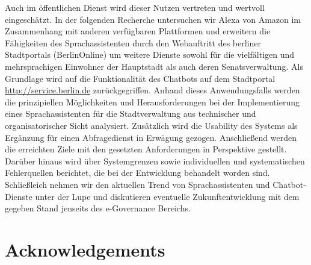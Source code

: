Auch im öffentlichen Dienst wird dieser Nutzen vertreten und wertvoll eingeschätzt. In der folgenden Recherche untersuchen wir Alexa von Amazon im Zusammenhang mit anderen verfügbaren Plattformen und erweitern die Fähigkeiten des Sprachassistenten durch den Webauftritt des berliner Stadtportals (BerlinOnline) um weitere Dienste sowohl für die vielfältigen und mehrsprachigen Einwohner der Hauptstadt als auch deren Senatsverwaltung. Als Grundlage wird auf die Funktionalität des Chatbots auf dem Stadtportal \href{ https://service.berlin.de/virtueller-assistent/virtueller-assistent-606279.php}{http://service.berlin.de} zurückgegriffen. Anhand dieses Anwendungsfalls werden die prinzipiellen Möglichkeiten und Herausforderungen bei der Implementierung eines Sprachassistenten für die Stadtverwaltung aus technischer und organisatorischer Sicht analysiert. Zusätzlich wird die Usability des Systems als Ergänzung für einen Abfragedienst in Erwägung gezogen. Anschließend werden die erreichten Ziele mit den gesetzten Anforderungen in Perspektive gestellt. Darüber hinaus wird über Systemgrenzen sowie individuellen und systematischen Fehlerquellen berichtet, die bei der Entwicklung behandelt worden sind.\\


Schließleich nehmen wir den aktuellen Trend von Sprachassistenten und Chatbot-Dienste unter der Lupe und diskutieren eventuelle Zukunftentwicklung mit dem gegeben Stand jenseits des e-Governance Bereichs.









\newpage
\chapter*{Acknowledgements}



\vfill

 \\
 \\
\\
\\

